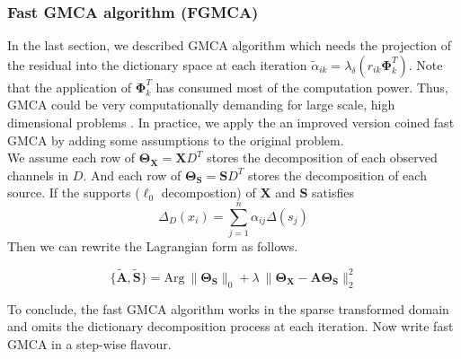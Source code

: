 \subsubsection{Fast GMCA algorithm (FGMCA)}
In the last section, we described GMCA algorithm which needs the projection of the residual into the dictionary space at each iteration $\tilde{\alpha}_{ik} = \lambda_{\delta}(r_{ik}\mathbf{\Phi}_k^T)$. Note that the application of $\mathbf{\Phi}_k^T$ has consumed most of the computation power. Thus, GMCA could be very computationally demanding for large scale, high dimensional problems \cite{BobinJ_2007SaMD}. In practice, we apply the an improved version coined fast GMCA by adding some assumptions to the original problem.\\

We assume each row of $\mathbf{\Theta_X}=\mathbf{X}D^T$ stores the decomposition of each observed channels in $D$. And each row of $\mathbf{\Theta_S}=\mathbf{S}D^T$ stores the decomposition of each source. 
If the supports ($\ell_0$ decompostion) of $\mathbf{X}$ and $\mathbf{S}$ satisfies 
\begin{equation}
    \Delta_D(x_i) = \sum_{j=1}^{n}\alpha_{ij}\Delta(s_j)
\end{equation}
Then we can rewrite the Lagrangian form \label{GMCAequation} as follows.

\begin{equation}
    \{\mathbf{\tilde{A},\tilde{S}}\} = \text{Arg} \: 
    \lVert \mathbf{\Theta_S} \rVert_0 + \lambda \:\lVert \mathbf{\Theta_X} - \mathbf{A\Theta_S} \rVert^2_2
\label{fast-gmca}
\end{equation}

To conclude, the fast GMCA algorithm works in the sparse transformed domain and omits the dictionary decomposition process at each iteration. Now write fast GMCA in a step-wise flavour.

